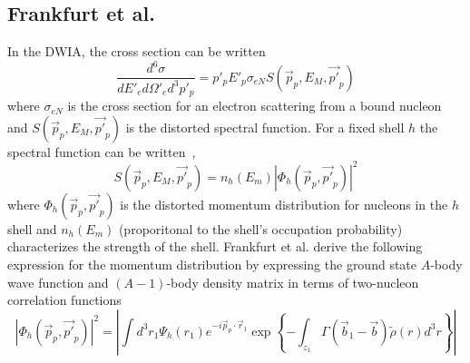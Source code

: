 \subsection{Frankfurt et al.}



In the DWIA, the cross section can be written
\begin{equation}
    \frac{d^6\sigma}{dE'_{e} d\Omega'_{e} d^3p'_{p}} = p'_p E'_p \sigma_{eN} S(\vec{p}_p, E_M, \vec{p'}_p)
\end{equation}
where $\sigma_{eN}$ is the cross section for an electron scattering from a
bound nucleon and $S(\vec{p}_p, E_M, \vec{p'}_p)$ is the distorted
spectral function.
For a fixed shell $h$ the spectral function can be written~\cite{Frullani_1984},
\begin{equation}
    S(\vec{p}_p, E_M, \vec{p'}_p) = n_h(E_m) |\Phi_h(\vec{p}_p, \vec{p'}_p)|^2
\end{equation}
where $\Phi_h(\vec{p}_p, \vec{p'}_p)$ is the distorted momentum distribution for
nucleons in the $h$ shell
and
$n_h(E_m)$ (proporitonal to the shell's occupation probability) characterizes
the strength of the shell.
Frankfurt et al. derive the following expression for the momentum distribution
by expressing the ground state $A$-body wave function and $(A-1)$-body density
matrix in terms of two-nucleon correlation functions
\begin{equation}
    \left| \Phi_h(\vec{p}_p, \vec{p'}_p)\right|^2
        = \left|
            \int d^3 r_1 \Psi_h(r_1) e^{-i \vec{p}_p \cdot \vec{r}_1}
            \exp{\left\{- \int_{z_{1}} \Gamma\left(\vec{b}_1-\vec{b}\right) \tilde{\rho}(r) d^3 r\right\}}
          \right|
\end{equation}

